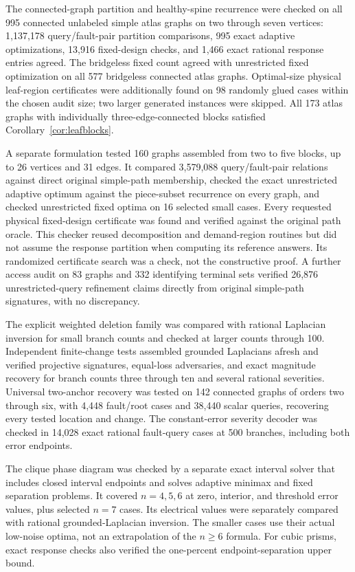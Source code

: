 \documentclass[11pt,letterpaper]{article}
\begin{document}
The connected-graph partition and healthy-spine recurrence were checked on all 995 connected unlabeled simple atlas graphs on two through seven vertices: 1,137,178 query/fault-pair partition comparisons, 995 exact adaptive optimizations, 13,916 fixed-design checks, and 1,466 exact rational response entries agreed. The bridgeless fixed count agreed with unrestricted fixed optimization on all 577 bridgeless connected atlas graphs. Optimal-size physical leaf-region certificates were additionally found on 98 randomly glued cases within the chosen audit size; two larger generated instances were skipped. All 173 atlas graphs with individually three-edge-connected blocks satisfied Corollary~\ref{cor:leafblocks}.

A separate formulation tested 160 graphs assembled from two to five blocks, up to 26 vertices and 31 edges. It compared 3,579,088 query/fault-pair relations against direct original simple-path membership, checked the exact unrestricted adaptive optimum against the piece-subset recurrence on every graph, and checked unrestricted fixed optima on 16 selected small cases. Every requested physical fixed-design certificate was found and verified against the original path oracle. This checker reused decomposition and demand-region routines but did not assume the response partition when computing its reference answers. Its randomized certificate search was a check, not the constructive proof. A further access audit on 83 graphs and 332 identifying terminal sets verified 26,876 unrestricted-query refinement claims directly from original simple-path signatures, with no discrepancy.

The explicit weighted deletion family was compared with rational Laplacian inversion for small branch counts and checked at larger counts through 100. Independent finite-change tests assembled grounded Laplacians afresh and verified projective signatures, equal-loss adversaries, and exact magnitude recovery for branch counts three through ten and several rational severities. Universal two-anchor recovery was tested on 142 connected graphs of orders two through six, with 4,448 fault/root cases and 38,440 scalar queries, recovering every tested location and change. The constant-error severity decoder was checked in 14,028 exact rational fault-query cases at 500 branches, including both error endpoints.

The clique phase diagram was checked by a separate exact interval solver that includes closed interval endpoints and solves adaptive minimax and fixed separation problems. It covered $n=4,5,6$ at zero, interior, and threshold error values, plus selected $n=7$ cases. Its electrical values were separately compared with rational grounded-Laplacian inversion. The smaller cases use their actual low-noise optima, not an extrapolation of the $n\ge6$ formula. For cubic prisms, exact response checks also verified the one-percent endpoint-separation upper bound.
\end{document}
